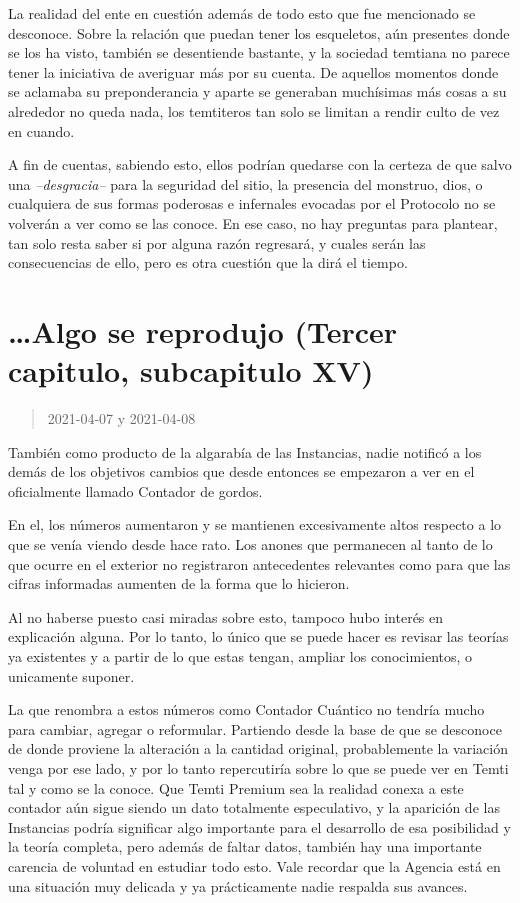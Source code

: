 \documentclass[
  spanish,
]{book}
\begin{document}
La realidad del ente en cuestión además de todo esto que fue mencionado se desconoce. Sobre la relación que puedan tener los esqueletos, aún presentes donde se los ha visto, también se desentiende bastante, y la sociedad temtiana no parece tener la iniciativa de averiguar más por su cuenta. De aquellos momentos donde se aclamaba su preponderancia y aparte se generaban muchísimas más cosas a su alrededor no queda nada, los temtiteros tan solo se limitan a rendir culto de vez en cuando.

A fin de cuentas, sabiendo esto, ellos podrían quedarse con la certeza de que salvo una \emph{--desgracia--} para la seguridad del sitio, la presencia del monstruo, dios, o cualquiera de sus formas poderosas e infernales evocadas por el Protocolo no se volverán a ver como se las conoce. En ese caso, no hay preguntas para plantear, tan solo resta saber si por alguna razón regresará, y cuales serán las consecuencias de ello, pero es otra cuestión que la dirá el tiempo.

\hypertarget{algo-se-reprodujo-tercer-capitulo-subcapitulo-xv}{%
\section{\ldots Algo se reprodujo (Tercer capitulo, subcapitulo XV)}\label{algo-se-reprodujo-tercer-capitulo-subcapitulo-xv}}

\begin{quote}
2021-04-07 y 2021-04-08
\end{quote}

También como producto de la algarabía de las Instancias, nadie notificó a los demás de los objetivos cambios que desde entonces se empezaron a ver en el oficialmente llamado Contador de gordos.

En el, los números aumentaron y se mantienen excesivamente altos respecto a lo que se venía viendo desde hace rato. Los anones que permanecen al tanto de lo que ocurre en el exterior no registraron antecedentes relevantes como para que las cifras informadas aumenten de la forma que lo hicieron.

Al no haberse puesto casi miradas sobre esto, tampoco hubo interés en explicación alguna. Por lo tanto, lo único que se puede hacer es revisar las teorías ya existentes y a partir de lo que estas tengan, ampliar los conocimientos, o unicamente suponer.

La que renombra a estos números como Contador Cuántico no tendría mucho para cambiar, agregar o reformular. Partiendo desde la base de que se desconoce de donde proviene la alteración a la cantidad original, probablemente la variación venga por ese lado, y por lo tanto repercutiría sobre lo que se puede ver en Temti tal y como se la conoce. Que Temti Premium sea la realidad conexa a este contador aún sigue siendo un dato totalmente especulativo, y la aparición de las Instancias podría significar algo importante para el desarrollo de esa posibilidad y la teoría completa, pero además de faltar datos, también hay una importante carencia de voluntad en estudiar todo esto. Vale recordar que la Agencia está en una situación muy delicada y ya prácticamente nadie respalda sus avances.
\end{document}
